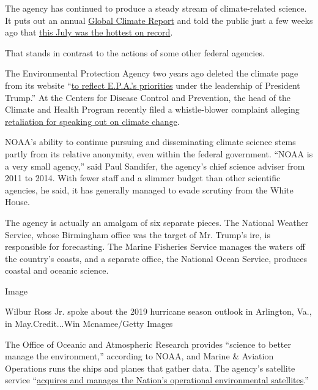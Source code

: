 The agency has continued to produce a steady stream of climate-related
science. It puts out an annual
\href{https://www.ncdc.noaa.gov/sotc/global/201904}{Global Climate
Report} and told the public just a few weeks ago that
\href{https://www.noaa.gov/news/july-2019-was-hottest-month-on-record-for-planet}{this
July was the hottest on record}.

That stands in contrast to the actions of some other federal agencies.

The Environmental Protection Agency two years ago deleted the climate
page from its website
``\href{https://www.washingtonpost.com/news/energy-environment/wp/2017/05/04/the-epa-is-reviewing-its-climate-change-website-these-scientists-say-it-was-already-accurate/}{to
reflect E.P.A.'s priorities} under the leadership of President Trump.''
At the Centers for Disease Control and Prevention, the head of the
Climate and Health Program recently filed a whistle-blower complaint
alleging
\href{https://insideclimatenews.org/news/16082019/cdc-scientist-whistleblower-complaint-climate-health-research-trump-usda-epa}{retaliation
for speaking out on climate change}.

NOAA's ability to continue pursuing and disseminating climate science
stems partly from its relative anonymity, even within the federal
government. ``NOAA is a very small agency,'' said Paul Sandifer, the
agency's chief science adviser from 2011 to 2014. With fewer staff and a
slimmer budget than other scientific agencies, he said, it has generally
managed to evade scrutiny from the White House.

The agency is actually an amalgam of six separate pieces. The National
Weather Service, whose Birmingham office was the target of Mr. Trump's
ire, is responsible for forecasting. The Marine Fisheries Service
manages the waters off the country's coasts, and a separate office, the
National Ocean Service, produces coastal and oceanic science.

Image

Wilbur Ross Jr. spoke about the 2019 hurricane season outlook in
Arlington, Va., in May.Credit...Win Mcnamee/Getty Images

The Office of Oceanic and Atmospheric Research provides ``science to
better manage the environment,'' according to NOAA, and Marine \&
Aviation Operations runs the ships and planes that gather data. The
agency's satellite service
``\href{https://www.corporateservices.noaa.gov/public/lineoffices.html}{acquires
and manages the Nation's operational environmental satellites}.''

